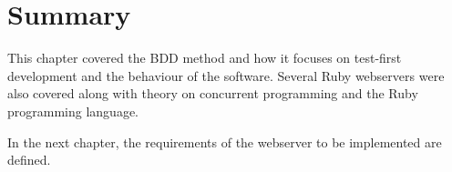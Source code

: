 \section{Summary}
This chapter covered the BDD method and how it focuses on test-first
development and the behaviour of the software. Several Ruby webservers were
also covered along with theory on concurrent programming and the Ruby
programming language.

In the next chapter, the requirements of the webserver to be implemented are
defined.
